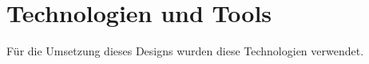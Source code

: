 \section{Technologien und Tools}
Für die Umsetzung dieses Designs wurden diese Technologien verwendet.